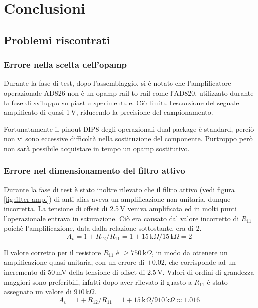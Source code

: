 \chapter{Conclusioni}
\section{Problemi riscontrati}

\subsection{Errore nella scelta dell'opamp}
\label{sec:err-opamp}

Durante la fase di test, dopo l'assemblaggio, si \`e notato che
l'amplificatore operazionale AD826 non \`e un opamp rail to rail come l'AD820,
utilizzato durante la fase di sviluppo su piastra sperimentale.  Ci\`o limita
l'escursione del segnale amplificato di quasi 1\,V, riducendo la precisione
del campionamento.

Fortunatamente il pinout DIP8 degli operazionali dual package \`e standard,
perci\`o non vi sono eccessive difficolt\`a nella sostituzione del componente.
Purtroppo per\`o non sar\`a possibile acquistare in tempo un opamp
sostitutivo.

\subsection{Errore nel dimensionamento del filtro attivo}
\label{sec:err-filter}

Durante la fase di test \`e stato inoltre rilevato che il filtro attivo (vedi
figura \ref{fig:filter-ampl}) di anti-alias aveva un amplificazione non
unitaria, dunque incorretta.  La tensione di offset di 2.5\,V veniva
amplificata ed in molti punti l'operazionale entrava in saturazione.  Ci\`o
era causato dal valore incorretto di \(R_{11}\) poich\`e l'amplificazione,
data dalla relazione sottostante, era  di 2.
\[
    A_v = 1+R_{12}/R_{11} = 1+15\,\text{k}\Omega/15\,\text{k}\Omega = 2
\]

Il valore corretto per il resistore \(R_{11}\) \`e
\(\geq 750\,\text{k}\Omega\), in modo da ottenere un amplificazione quasi
unitaria, con un errore di \(+0.02\), che corrisponde ad un incremento di
50\,mV della tensione di offset di 2.5\,V. Valori di ordini di grandezza
maggiori sono preferibili, infatti dopo aver rilevato il guasto a \(R_{11}\)
\`e stato assegnato un valore di \(910\,\text{k}\Omega\).
\[
    A_v = 1+R_{12}/R_{11} = 1+15\,\text{k}\Omega/910\,\text{k}\Omega \approx 1.016
\]

